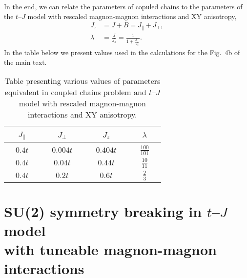\documentclass[%
 reprint,
 amsmath,amssymb,
 aps, onecolumn,
prl,
]{revtex4-1}
\begin{document}
In the end, we can relate the parameters of copuled chains to the parameters of the $t$--$J$ model with rescaled magnon-magnon interactions and XY anisotropy,
\begin{align}
	J_z &= J + B = J_\parallel + J_\perp, \\
	\lambda &= \frac{J}{J_z} = \frac{1}{1 + \frac{J_\perp}{J_\parallel}}.
\end{align}
In the table below we present values used in the calculations for the Fig.~4b of the main text.
\begin{table}[h!]
\begin{center}
\begin{tabular}{|| c | c || c | c ||} 
	\hline
	~~$J_\parallel$~~ & ~~$J_\perp$~~ & ~~$J_z$~~ & ~~$\lambda$~~ \\
	\hline\hline
	~~$0.4t$~~ & ~~$0.004t$~~ & ~~$0.404t$~~ & ~~$\frac{100}{101}$~~ \\  
	\hline
	$0.4t$ & $0.04t$ & $0.44t$ & $\frac{10}{11}$ \\ 
	\hline
	$0.4t$ & $0.2t$ & $0.6t$ & $\frac{2}{3}$ \\
	\hline
\end{tabular}
\end{center}
\caption{Table presenting various values of parameters equivalent in coupled chains problem and $t$--$J$ model with rescaled magnon-magnon interactions and XY anisotropy.}
\end{table}

\section{SU(2) symmetry breaking in $t$--$J$ model \\ with tuneable magnon-magnon interactions}
\end{document}
